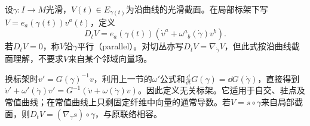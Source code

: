 \begin{definition}[沿曲线的协变导数]\label{def:derivative-along-curve}
设$\gamma:I\to M$光滑，$V(t)\in E_{\gamma(t)}$为沿曲线的光滑截面。在局部标架下写$V=e_a(\gamma(t))v^a(t)$，定义
\[
 D_tV=e_a(\gamma(t))\left(\dot v^a+
 \omega^a{}_b(\dot\gamma)v^b\right).
\]
若$D_tV=0$，称$V$沿$\gamma$平行（parallel）。对切丛亦写$D_tV=\nabla_{\dot\gamma}V$，但此式按沿曲线截面理解，不要求$V$来自某个邻域向量场。
\end{definition}
换标架时$v'=G(\gamma)^{-1}v$，利用上一节的$\omega'$公式和$\frac{\dd}{\dd t}G(\gamma)=\dd G(\dot\gamma)$，直接得到$\dot v'+\omega'(\dot\gamma)v'=G^{-1}(\dot v+\omega(\dot\gamma)v)$。因此定义无关标架。它适用于自交、驻点及常值曲线；在常值曲线上只剩固定纤维中向量的通常导数。若$V=s\circ\gamma$来自局部截面，则$D_tV=(\nabla_{\dot\gamma}s)\circ\gamma$，与原联络相容。

